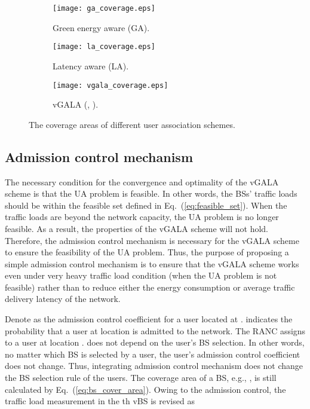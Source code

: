 \documentclass[journal]{IEEEtran}
\theoremstyle{definition}
\begin{document}
\begin{figure*}[ht]
\centering
\hspace*{\fill}
        \begin{subfigure}[b]{0.3\textwidth}
            \texttt{[image: ga\_coverage.eps]}
            \caption{Green energy aware (GA).}
            \label{fig:ga_area}
        \end{subfigure}\hfill
        \begin{subfigure}[b]{0.3\textwidth}
            \texttt{[image: la\_coverage.eps]}
            \caption{Latency aware (LA).}
            \label{fig:la_area}
        \end{subfigure}\hfill
        \begin{subfigure}[b]{0.3\textwidth}
            \texttt{[image: vgala\_coverage.eps]}
            \caption{vGALA (, ).}
            \label{fig:vgala_area}
        \end{subfigure}\hfill
    \caption{The coverage areas of different user association schemes.
     }\label{fig:sim_1_area_comp}
   \vspace{-16pt}
\end{figure*}

\subsection{Admission control mechanism}
The necessary condition for the convergence and optimality of the vGALA scheme is that the UA problem is feasible. In other words, the BSs' traffic loads should be within the feasible set defined in Eq.~(\ref{eq:feasible_set}). When the traffic loads are beyond the network capacity, the UA problem is no longer feasible. As a result, the properties of the vGALA scheme will not hold. Therefore, the admission control mechanism is necessary for the vGALA scheme to ensure the feasibility of the UA problem. Thus, the purpose of proposing a simple admission control mechanism is to ensure that the vGALA scheme works even under very heavy traffic load condition (when the UA problem is not feasible) rather than to reduce either the energy consumption or average traffic delivery latency of the network.

Denote  as the admission control coefficient for a user located at .  indicates the probability that a user at location  is admitted to the network. The RANC assigns  to a user at location .  does not depend on the user's BS selection. In other words, no matter which BS is selected by a user, the user's admission control coefficient does not change. Thus, integrating admission control mechanism does not change the BS selection rule of the users. The coverage area of a BS, e.g., , is still calculated by Eq.~(\ref{eq:bs_cover_area}). Owing to the admission control, the traffic load measurement in the th vBS is revised as
\end{document}
